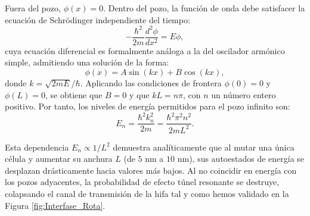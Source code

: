 \documentclass[a4paper,12pt]{article}
\begin{document}
Fuera del pozo, $\phi(x) = 0$. Dentro del pozo, la función de onda debe satisfacer la ecuación de Schrödinger independiente del tiempo:
\begin{equation}
  -\frac{\hbar^2}{2m}\frac{d^2\phi}{dx^2} = E\phi,
\end{equation}
cuya ecuación diferencial es formalmente análoga a la del oscilador armónico simple, admitiendo una solución de la forma:
\begin{equation}
  \phi(x) = A\sin(kx) + B\cos(kx),
\end{equation}
donde $k = \sqrt{2mE}/\hbar$. Aplicando las condiciones de frontera $\phi(0) = 0$ y $\phi(L) = 0$, se obtiene que $B = 0$ y que $kL = n\pi$, con $n$ un número entero positivo. Por tanto, los niveles de energía permitidos para el pozo infinito son:
\begin{equation}
  E_n = \frac{\hbar^2 k_n^2}{2m} = \frac{\hbar^2 \pi^2 n^2}{2mL^2}.
\end{equation}

Esta dependencia $E_n \propto 1/L^2$ demuestra analíticamente que al mutar una única célula y aumentar su anchura $L$ (de $5\text{ nm}$ a $10\text{ nm}$), sus autoestados de energía se desplazan drásticamente hacia valores más bajos. Al no coincidir en energía con los pozos adyacentes, la probabilidad de efecto túnel resonante se destruye, colapsando el canal de transmisión de la hifa tal y como hemos validado en la Figura \ref{fig:Interfase_Rota}.
\end{document}
